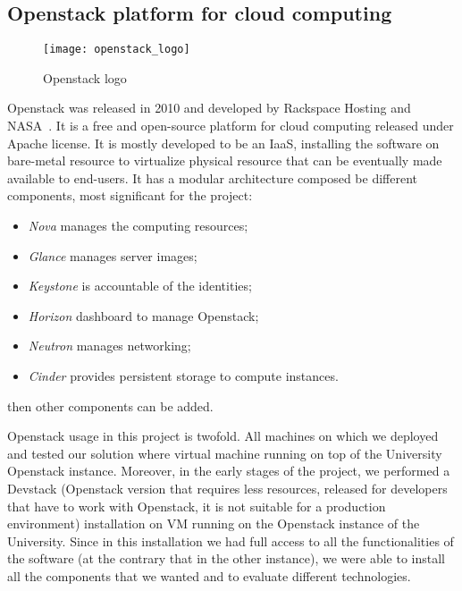 \subsection{Openstack platform for cloud computing}
\begin{figure}[t]
  \centering \texttt{[image: openstack\_logo]}
  \caption{Openstack logo}
  \label{chap:prjan:img:openstack_logo}
\end{figure}
Openstack was released in 2010 and developed by Rackspace Hosting and
NASA~\cite{openstackWebsite}. It is a free and open-source platform for cloud
computing released under Apache license. It is mostly developed to be an IaaS,
installing the software on bare-metal resource to virtualize physical resource
that can be eventually made available to end-users. It has a modular
architecture composed be different components, most significant for the project:
\begin{itemize}
\item \emph{Nova} manages the computing resources;
\item \emph{Glance} manages server images;
\item \emph{Keystone} is accountable of the identities;
\item \emph{Horizon} dashboard to manage Openstack;
\item \emph{Neutron} manages networking;
\item \emph{Cinder} provides persistent storage to compute instances.
\end{itemize}
then other components can be added.

Openstack usage in this project is twofold. All machines on which we deployed
and tested our solution where virtual machine running on top of the University
Openstack instance. Moreover, in the early stages of the project, we performed
a Devstack (Openstack version that requires less resources, released for
developers that have to work with Openstack, it is not suitable for a production
environment) installation on VM running on the Openstack instance of
the University. Since in this installation we had full access to all the
functionalities of the software (at the contrary that in the other instance), we
were able to install all the components that we wanted and to evaluate different
technologies.


